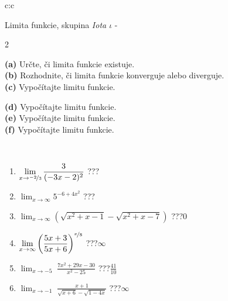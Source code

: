 \documentclass[10pt]{report}
\begin{document}
\thispagestyle{empty}
\begin{tabular}{c:c}
\begin{minipage}[c][104.5mm][t]{0.5\linewidth}
\begin{center}
\vspace{7mm}
{\huge Limita funkcie, skupina \textit{Iota $\iota$} -}\\[5mm]
\begin{minipage}{0.95\linewidth}
\begin{center}
{\small \begin{multicols}{2} \raggedright
\textbf{(a)} Určte, či limita funkcie existuje. \\[1mm]
\textbf{(b)} Rozhodnite, či limita funkcie konverguje alebo diverguje. \\[1mm]
\textbf{(c)} Vypočítajte limitu funkcie. \par \columnbreak
\textbf{(d)} Vypočítajte limitu funkcie. \\[1mm]
\textbf{(e)} Vypočítajte limitu funkcie. \\[1mm]
\textbf{(f)} Vypočítajte limitu funkcie. \\[1mm]
\end{multicols}
}
\end{center}
\end{minipage}
\\[4mm]
\begin{minipage}{0.79\linewidth}
\begin{center}
\begin{varwidth}{\linewidth}
\begin{enumerate}
\normalsize
\item $\displaystyle\lim_{x\to\nicefrac{-2}{3}}{\frac{3}{(-3x-2)^{2}}}$\quad \dotfill\; ???\;\dotfill \quad {}
\item $\displaystyle\lim_{x\to\infty}{5^{-6+4x^2}}$\quad \dotfill\; ???\;\dotfill \quad {}
\item $\displaystyle\lim_{x\to\infty}{\left(\sqrt{x^2+x-1} - \sqrt{x^2+x-7}\right)}$\quad \dotfill\; ???\;\dotfill \quad $0$
\item $\displaystyle\lim_{x\to\infty}{\left( \frac{5x+3}{5x+6} \right)^{\nicefrac{x}{8}}}$\quad \dotfill\; ???\;\dotfill \quad $\infty$
\item $\displaystyle\lim_{x\to -5}{\;\frac{7x^2+29x-30}{x^2-25}}$\quad \dotfill\; ???\;\dotfill \quad $\frac{41}{10}$
\item $\displaystyle\lim_{x\to -1}{\;\frac{x+1}{\sqrt{x+6} - \sqrt{1-4x}}}$\quad \dotfill\; ???\;\dotfill \quad $\infty$

\end{enumerate}
\end{varwidth}
\end{center}
\end{minipage}
\end{center}
\end{minipage}
\end{tabular}
\end{document}
